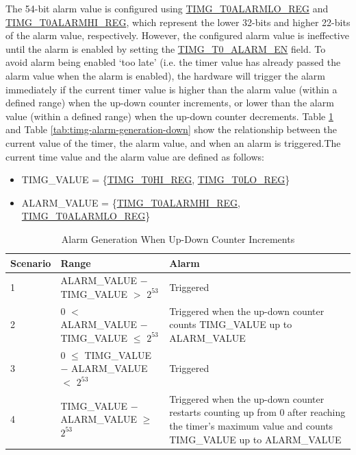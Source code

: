 \documentclass[main\_\_EN.tex]{subfiles}
\begin{document}
The 54-bit alarm value is configured using \hyperref[regdesc:TIMGTXALARMLOREG]{TIMG\_T0ALARMLO\_REG} and \hyperref[regdesc:TIMGTXALARMHIREG]{TIMG\_T0ALARMHI\_REG}, which 
represent the lower 32-bits and higher 22-bits of the alarm value, respectively. However, the configured alarm value is ineffective until the alarm is enabled by setting the \hyperref[fielddesc:TIMGTXALARMEN]{TIMG\_T0\_ALARM\_EN} field. To avoid alarm being enabled `too late' (i.e. the timer value has already passed the alarm value when the alarm is enabled), the hardware will trigger the alarm immediately if the current timer value is higher than the alarm value (within a defined range) when the up-down counter increments, or lower than the alarm value (within a defined range) when the up-down counter decrements. Table \ref{tab:timg-alarm-generation-up} and Table \ref{tab:timg-alarm-generation-down} show the relationship between the current value of the timer, the alarm value, and when an alarm is triggered.The current time value and the alarm value are defined as follows:

\begin{itemize}
    \item TIMG\_VALUE = \{\hyperref[regdesc:TIMGTXHIREG]{TIMG\_T0HI\_REG}, \hyperref[regdesc:TIMGTXLOREG]{TIMG\_T0LO\_REG}\}
    \item ALARM\_VALUE = \{\hyperref[regdesc:TIMGTXALARMHIREG]{TIMG\_T0ALARMHI\_REG}, \hyperref[regdesc:TIMGTXALARMLOREG]{TIMG\_T0ALARMLO\_REG}\}
\end{itemize}



\begin{table}[H]
\centering
\caption{Alarm Generation When Up-Down Counter Increments}
\label{tab:timg-alarm-generation-up}

\begin{tabular}{|l|l|m{7cm}|}
\hline
\rowcolor{lightgray}
    \textbf{Scenario} & \textbf{Range} & \textbf{Alarm} \\\hline
     1 & ALARM\_VALUE $-$ TIMG\_VALUE $>$ $2^{53}$ & Triggered \\\hline
     2 & 0 $<$ ALARM\_VALUE $-$ TIMG\_VALUE $\leq$ $2^{53}$ & Triggered when the up-down counter counts TIMG\_VALUE up to ALARM\_VALUE \\\hline
     3 & 0 $\leq$ TIMG\_VALUE $-$ ALARM\_VALUE $<$ $2^{53}$ & Triggered \\\hline
     4 & TIMG\_VALUE $-$ ALARM\_VALUE $\geq$ $2^{53}$ & Triggered when the up-down counter restarts counting up from 0 after reaching the timer's maximum value and counts TIMG\_VALUE up to ALARM\_VALUE \\\hline

\end{tabular}
\end{table}
\end{document}
